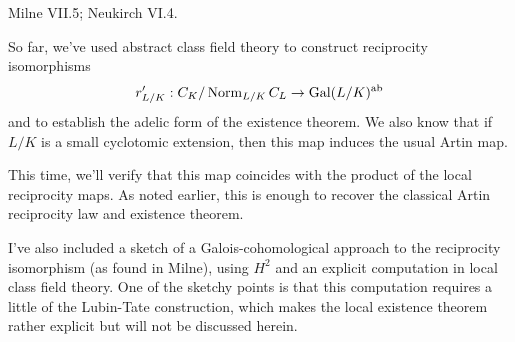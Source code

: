 %
%
%
%
%
%
%

Milne VII.5; Neukirch VI.4.

\medskip
So far, we've used abstract class field theory to construct
reciprocity isomorphisms
\[
r'_{L/K}: C_K/\operatorname{Norm}_{L/K} C_L \to \operatorname{Gal}(L/K)^{\operatorname{ab}}
\]
and to establish the adelic form of the existence theorem. We also
know that if $L/K$ is a small cyclotomic extension, then this
map induces the usual Artin map.

This time, we'll verify that this map coincides with the product of the
local reciprocity maps. As noted earlier, this is enough to recover the
classical Artin reciprocity law and existence theorem.

I've also included a sketch of a Galois-cohomological approach to the reciprocity isomorphism (as found in Milne),
using $H^2$ and an explicit computation in local class field theory.
One of the sketchy points is that this computation 
requires a little of the Lubin-Tate construction, which makes the local existence theorem rather explicit but will not be discussed herein.

